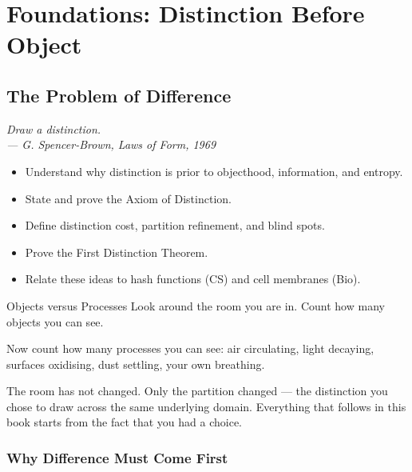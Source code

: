\documentclass[12pt,twoside,openright]{book}
\newenvironment{epigraph}[2]{%
  \vspace{1em}\begin{flushright}
  \begin{minipage}{0.72\textwidth}
  \itshape\small #1\\[0.4em]
  \upshape\footnotesize\sffamily\color{DistGray}--- #2
  \end{minipage}\end{flushright}\vspace{1.5em}}{}
\newenvironment{objectives}{%
  \begin{tcolorbox}[colback=DistBlue!5,colframe=DistBlue,
    title={\faCheckCircle\enspace Learning Objectives},
    fonttitle=\sffamily\bfseries\color{white},
    attach boxed title to top left={yshift=-2mm,xshift=4mm},
    boxed title style={colback=DistBlue},breakable]
  \begin{itemize}[leftmargin=*,nosep]}{%
  \end{itemize}\end{tcolorbox}\vspace{1em}}
\begin{document}
\part{Foundations: Distinction Before Object}


\chapter{The Problem of Difference}
\label{ch:distinction}

\begin{epigraph}{Draw a distinction.}%
  {G. Spencer-Brown, \textit{Laws of Form}, 1969
  \parencite{spencer-brown1969}}
\end{epigraph}

\begin{objectives}
  \item Understand why distinction is prior to objecthood,
        information, and entropy.
  \item State and prove the Axiom of Distinction.
  \item Define distinction cost, partition refinement, and
        blind spots.
  \item Prove the First Distinction Theorem.
  \item Relate these ideas to hash functions (CS) and
        cell membranes (Bio).
\end{objectives}

\begin{fiveminute}{Objects versus Processes}
Look around the room you are in. Count how many objects you
can see.

Now count how many processes you can see: air circulating,
light decaying, surfaces oxidising, dust settling, your own
breathing.

The room has not changed. Only the partition changed --- the
distinction you chose to draw across the same underlying
domain. Everything that follows in this book starts from the
fact that you had a choice.
\end{fiveminute}

\section{Why Difference Must Come First}
\label{sec:ch1-priority}
\end{document}
